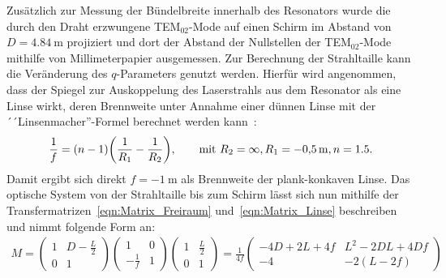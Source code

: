 \documentclass[a4paper,twoside,final]{article}
\begin{document}
Zusätzlich zur Messung der Bündelbreite innerhalb des Resonators wurde die durch den Draht erzwungene TEM$_{02}$-Mode auf einen Schirm im Abstand von $D = \SI{4.84}{\metre}$ projiziert und dort der Abstand der Nullstellen der TEM$_{02}$-Mode mithilfe von Millimeterpapier ausgemessen. Zur Berechnung der Strahltaille kann die Veränderung des $q$-Parameters genutzt werden. Hierfür wird angenommen, dass der Spiegel zur Auskoppelung des Laserstrahls aus dem Resonator als eine Linse wirkt, deren Brennweite unter Annahme einer dünnen Linse mit der ´´Linsenmacher''-Formel berechnet werden kann~\cite{Hecht}:
\begin{align}
  \frac{1}{f} = (n-1)\qty(\frac{1}{R_1}-\frac{1}{R_2}), \qquad \text{mit } R_2 = \infty, R_1 = -\SI{0.5}{\metre}, n = 1.5.
\end{align}
Damit ergibt sich direkt $f = -\SI{1}{\metre}$ als Brennweite der plank-konkaven Linse. Das optische System von der Strahltaille bis zum Schirm lässt sich nun mithilfe der Transfermatrizen~\eqref{eqn:Matrix_Freiraum} und~\eqref{eqn:Matrix_Linse} beschreiben und nimmt folgende Form an:
\begin{align}\label{eqn:Transfermatrix_Praxis}
  M = \begin{pmatrix}
    1 & D-\frac{L}{2} \\ 0 & 1
\end{pmatrix} \begin{pmatrix}
  1 & 0 \\ -\frac{1}{f} & 1
\end{pmatrix} \begin{pmatrix}
  1 & \frac{L}{2} \\ 0 & 1
\end{pmatrix} = \frac{1}{4f} \begin{pmatrix}
  -4D+2L +4f & L^2 - 2DL + 4Df \\ -4 & -2(L-2f)
\end{pmatrix}
\end{align}
\end{document}
